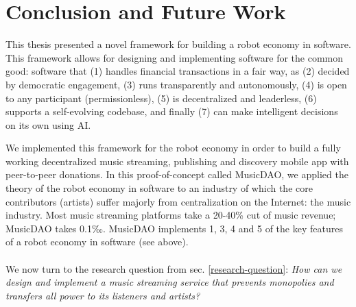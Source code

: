 \chapter{Conclusion and Future Work}
This thesis presented a novel framework for building a robot economy in software. This framework allows for designing and implementing software for the common good: software that (1) handles financial transactions in a fair way, as (2) decided by democratic engagement, (3) runs transparently and autonomously, (4) is open to any participant (permissionless), (5) is decentralized and leaderless, (6) supports a self-evolving codebase, and finally (7) can make intelligent decisions on its own using AI.

We implemented this framework for the robot economy in order to build a fully working decentralized music streaming, publishing and discovery mobile app with peer-to-peer donations. In this proof-of-concept called MusicDAO, we applied the theory of the robot economy in software to an industry of which the core contributors (artists) suffer majorly from centralization on the Internet: the music industry. Most music streaming platforms take a 20-40\% cut of music revenue; MusicDAO takes 0.1‰. MusicDAO implements 1, 3, 4 and 5 of the key features of a robot economy in software (see above).
\\
\\
We now turn to the research question from sec. \ref{research-question}: 
\textit{How can we design and implement a music streaming service that prevents monopolies and transfers all power to its listeners and artists?}

